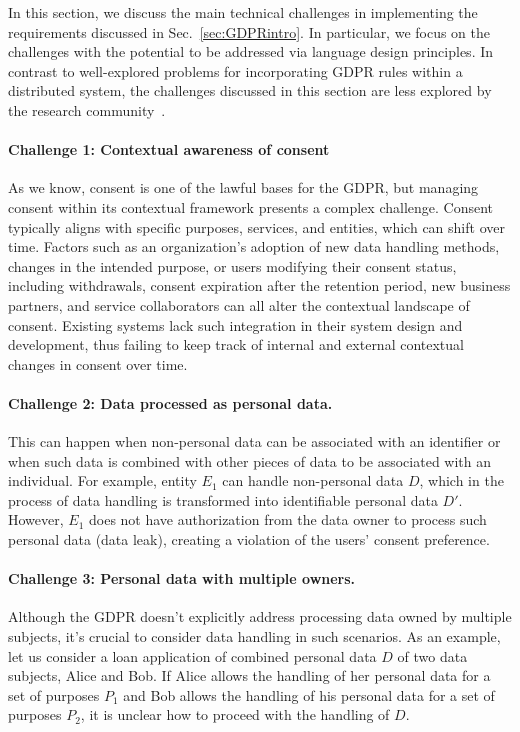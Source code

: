 In this section, we discuss the main technical challenges in implementing the requirements discussed in Sec.~\ref{sec:GDPRintro}.
In particular, we focus on the challenges with the potential to be addressed via language design principles.
In contrast to well-explored problems for incorporating GDPR rules within a distributed system, the challenges discussed in this section are less explored by the research community~\cite{kutylowski_gdpr_2020}. 

\paragraph{\textbf{Challenge 1: Contextual awareness of consent }} \label{chal1}
As we know, consent is one of the lawful bases for the GDPR, but managing consent within its contextual framework presents a complex challenge. Consent typically aligns with specific purposes, services, and entities, which can shift over time. Factors such as an organization's adoption of new data handling methods, changes in the intended purpose, or users modifying their consent status, including withdrawals, consent expiration after the retention period, new business partners, and service collaborators can all alter the contextual landscape of consent. Existing systems lack such integration in their system design and development, thus failing to keep track of internal and external contextual changes in consent over time. 

\paragraph{\textbf{Challenge 2: Data processed as personal data.}}\label{chal2}
This can happen when non-personal data can be associated with an identifier or when such data is combined with other pieces of data to be associated with an individual. For example, entity $E_1$ can handle non-personal data $D$, which in the process of data handling is transformed into identifiable personal data $D'$. However, $E_1$ does not have authorization from the data owner to process such personal data (data leak), creating a violation of the users' consent preference. 

\paragraph{\textbf{Challenge 3: Personal data with multiple owners.}}\label{chal3}
Although the GDPR doesn't explicitly address processing data owned by multiple subjects, it's crucial to consider data handling in such scenarios. As an example, let us consider a loan application of combined personal data $D$ of two data subjects, Alice and Bob. If Alice allows the handling of her personal data for a set of purposes $ P_1$ and Bob allows the handling of his personal data for a set of purposes $P_2$, it is unclear how to proceed with the handling of $D$.  

